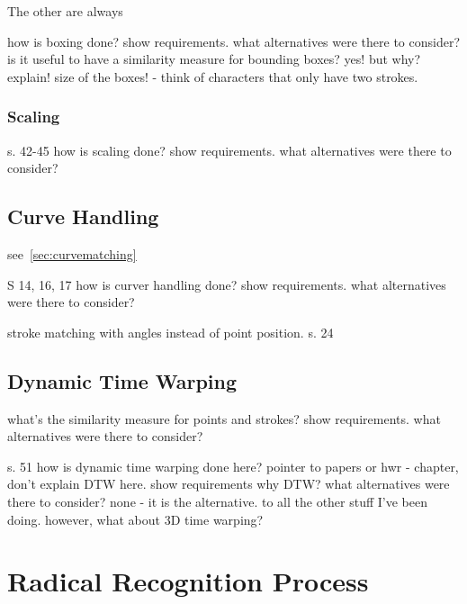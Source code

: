 The other are always 

how is boxing done?
show requirements.
what alternatives were there to consider?
is it useful to have a similarity measure for bounding boxes?
yes! but why? explain!
size of the boxes! - think of characters that only have two strokes.

\subsubsection{Scaling}
\label{sec:hwre:scaling}

s. 42-45
how is scaling done?
show requirements.
what alternatives were there to consider?

\subsection{Curve Handling}
\label{sec:hwre:curvehandling}

see~\ref{sec:curvematching}

S 14, 16, 17
how is curver handling done?
show requirements.
what alternatives were there to consider?

stroke matching with angles instead of point position.
s. 24

\subsection{Dynamic Time Warping}
\label{sec:hwre:dynamictimewarping}

what's the similarity measure for
points and strokes?
show requirements.
what alternatives were there to consider?

s. 51
how is dynamic time warping done here?
pointer to papers or hwr - chapter, don't explain DTW here.
show requirements
why DTW?
what alternatives were there to consider?
none - it is the alternative.
to all the other stuff I've been doing.
however, what about 3D time warping?


\section{Radical Recognition Process}
\label{sec:hwre:radicalrecognitionprocess}



